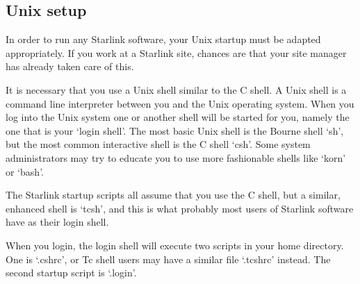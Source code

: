 
%
%
%
%
%
%
%
%
%


\subsection{\label{unixstart}Unix setup}

   In order to run any Starlink software, your Unix startup must be
   adapted appropriately. If you work at a Starlink site, chances are
   that your site manager has already taken care of this.

   It is necessary that you use a Unix shell similar to the C shell.
   A Unix shell is a command line interpreter between you and the Unix
   operating system. When you log into the Unix system one or another
   shell will be started for you, namely the one that is your `login
   shell'. The most basic Unix shell is the Bourne shell `sh', but the
   most common interactive shell is the C shell `csh'. Some system
   administrators may try to educate you to use more fashionable shells
   like `korn' or `bash'.

   The Starlink startup scripts all assume that you use the C shell, but
   a similar, enhanced shell is `tcsh', and this is what probably most
   users of Starlink software have as their login shell.

   When you login, the login shell will execute two scripts in your home
   directory. One is `.cshrc', or Tc shell users may have a similar file
   `.tcshrc' instead. The second startup script is `.login'.

